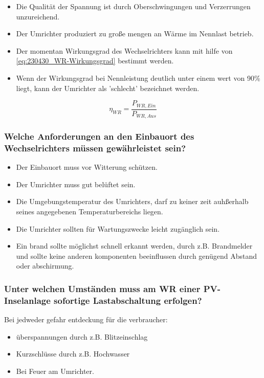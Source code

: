 \begin{itemize}
    \item Die Qualität der Spannung ist durch Oberschwingungen und Verzerrungen unzureichend.
    \item Der Umrichter produziert zu große mengen an Wärme im Nennlast betrieb.
    \item Der momentan Wirkungsgrad des Wechselrichters kann mit hilfe von \autoref{eq:230430_WR-Wirkungsgrad} bestimmt werden.
    \item Wenn der Wirkungsgrad bei Nennleistung deutlich unter einem wert von 90\% liegt, kann der Umrichter als 'schlecht' bezeichnet werden.
\end{itemize}

\begin{equation}
    \eta_{WR} = \frac{P_{WR,Ein}}{P_{WR,Aus}}
    \label{eq:230430_WR-Wirkungsgrad}
\end{equation}

\subsubsection{Welche Anforderungen an den Einbauort des Wechselrichters müssen gewährleistet sein?}
\begin{itemize}
    \item Der Einbauort muss vor Witterung schützen.
    \item Der Umrichter muss gut belüftet sein.
    \item Die Umgebungstemperatur des Umrichters, darf zu keiner zeit auhßerhalb seines angegebenen Temperaturbereichs liegen.
    \item Die Umrichter sollten für Wartungszwecke leicht zugänglich sein.
    \item Ein brand sollte möglichst schnell erkannt werden, durch z.B. Brandmelder und sollte keine anderen komponenten beeinflussen durch genügend Abstand oder abschirmung.
\end{itemize}
\subsubsection{Unter welchen Umständen muss am WR einer PV-Inselanlage sofortige Lastabschaltung erfolgen?}
Bei jedweder gefahr entdeckung für die verbraucher:
\begin{itemize}
    \item überspannungen durch z.B. Blitzeinschlag
    \item Kurzschlüsse durch z.B. Hochwasser
    \item Bei Feuer am Umrichter.
\end{itemize}
